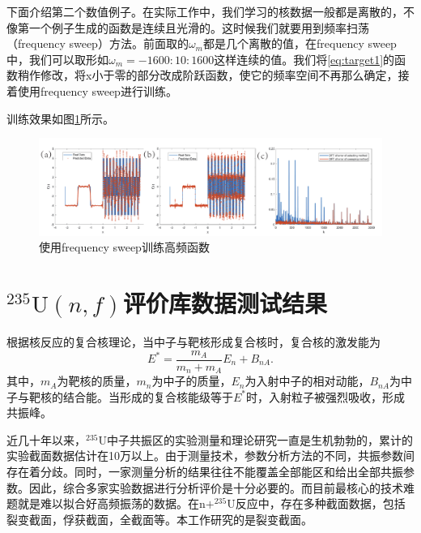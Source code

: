 
下面介绍第二个数值例子。在实际工作中，我们学习的核数据一般都是离散的，不像第一个例子生成的函数是连续且光滑的。这时候我们就要用到频率扫荡（frequency sweep）方法。前面取的$\omega _m$都是几个离散的值，在frequency sweep中，我们可以取形如$\omega _m=-1600:10:1600$这样连续的值。我们将\ref{eq:target1}的函数稍作修改，将x小于零的部分改成阶跃函数，使它的频率空间不再那么确定，接着使用frequency sweep进行训练。

训练效果如图\ref{sweep}\cite{cai2019phasednn}所示。
\begin{figure}[htbp!]
  \centering
  \includegraphics[width=0.84\linewidth]{figures/PPSDNN/1D-square.pdf}
  \caption{使用frequency sweep训练高频函数}
  \label{sweep}
\end{figure}


\section{$^{235}\text{U}(n,f)$评价库数据测试结果}
根据核反应的复合核理论，当中子与靶核形成复合核时，复合核的激发能为
\begin{equation}\label{}
  E^{\ast } = \frac{m_A}{m_n+m_A}E_n+B_{nA}.
\end{equation}
其中，$m_A$为靶核的质量，$m_n$为中子的质量，$E_n$为入射中子的相对动能，$B_{nA}$为中子与靶核的结合能。当形成的复合核能级等于$E^{\ast }$时，入射粒子被强烈吸收，形成共振峰。

近几十年以来，$^{235}\text{U}$中子共振区的实验测量和理论研究一直是生机勃勃的，累计的实验截面数据估计在10万以上。由于测量技术，参数分析方法的不同，共振参数间存在着分歧。同时，一家测量分析的结果往往不能覆盖全部能区和给出全部共振参数。因此，综合多家实验数据进行分析评价是十分必要的\cite{何锦昌1990中子共振参数的联合拟合分析}。而目前最核心的技术难题就是难以拟合好高频振荡的数据。在$\text{n}+^{235}\text{U}$反应中，存在多种截面数据，包括裂变截面，俘获截面，全截面等。本工作研究的是裂变截面。


